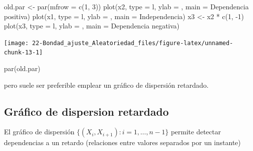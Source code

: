 \documentclass[
]{book}
\newenvironment{Shaded}{\begin{snugshade}}{\end{snugshade}}
\newcommand{\AttributeTok}[1]{\textcolor[rgb]{0.77,0.63,0.00}{#1}}
\newcommand{\DecValTok}[1]{\textcolor[rgb]{0.00,0.00,0.81}{#1}}
\newcommand{\FunctionTok}[1]{\textcolor[rgb]{0.00,0.00,0.00}{#1}}
\newcommand{\NormalTok}[1]{#1}
\newcommand{\OtherTok}[1]{\textcolor[rgb]{0.56,0.35,0.01}{#1}}
\newcommand{\SpecialCharTok}[1]{\textcolor[rgb]{0.00,0.00,0.00}{#1}}
\newcommand{\StringTok}[1]{\textcolor[rgb]{0.31,0.60,0.02}{#1}}
\theoremstyle{break}
\theoremstyle{definition}
\theoremstyle{definition}
\theoremstyle{definition}
\theoremstyle{definition}
\theoremstyle{remark}
\begin{document}
\begin{Shaded}
\begin{Highlighting}[]
\NormalTok{old.par }\OtherTok{\textless{}{-}} \FunctionTok{par}\NormalTok{(}\AttributeTok{mfrow =} \FunctionTok{c}\NormalTok{(}\DecValTok{1}\NormalTok{, }\DecValTok{3}\NormalTok{))}
\FunctionTok{plot}\NormalTok{(x2, }\AttributeTok{type =} \StringTok{\textquotesingle{}l\textquotesingle{}}\NormalTok{, }\AttributeTok{ylab =} \StringTok{\textquotesingle{}\textquotesingle{}}\NormalTok{, }\AttributeTok{main =} \StringTok{\textquotesingle{}Dependencia positiva\textquotesingle{}}\NormalTok{)}
\FunctionTok{plot}\NormalTok{(x1, }\AttributeTok{type =} \StringTok{\textquotesingle{}l\textquotesingle{}}\NormalTok{, }\AttributeTok{ylab =} \StringTok{\textquotesingle{}\textquotesingle{}}\NormalTok{, }\AttributeTok{main =} \StringTok{\textquotesingle{}Independencia\textquotesingle{}}\NormalTok{)}
\NormalTok{x3 }\OtherTok{\textless{}{-}}\NormalTok{ x2 }\SpecialCharTok{*} \FunctionTok{c}\NormalTok{(}\DecValTok{1}\NormalTok{, }\SpecialCharTok{{-}}\DecValTok{1}\NormalTok{)}
\FunctionTok{plot}\NormalTok{(x3, }\AttributeTok{type =} \StringTok{\textquotesingle{}l\textquotesingle{}}\NormalTok{, }\AttributeTok{ylab =} \StringTok{\textquotesingle{}\textquotesingle{}}\NormalTok{, }\AttributeTok{main =} \StringTok{\textquotesingle{}Dependencia negativa\textquotesingle{}}\NormalTok{)}
\end{Highlighting}
\end{Shaded}

\begin{center}\texttt{[image: 22-Bondad\_ajuste\_Aleatoriedad\_files/figure-latex/unnamed-chunk-13-1]} \end{center}

\begin{Shaded}
\begin{Highlighting}[]
\FunctionTok{par}\NormalTok{(old.par)}
\end{Highlighting}
\end{Shaded}

pero suele ser preferible emplear un gráfico de dispersión retardado.

\hypertarget{gruxe1fico-de-dispersion-retardado}{%
\subsection{Gráfico de dispersion retardado}\label{gruxe1fico-de-dispersion-retardado}}

El gráfico de dispersión \(\{(X_{i},X_{i+1}) : i = 1, \ldots, n-1 \}\) permite
detectar dependencias a un retardo (relaciones entre valores separados
por un instante)
\end{document}

